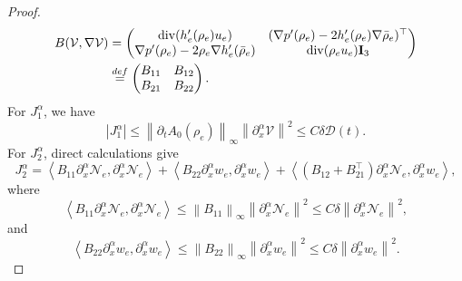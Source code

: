\documentclass[10pt,a4paper]{amsart}
\newcommand{\al}{\alpha}
\newcommand{\dive}{\mathrm{div}}
\newcommand{\pa}{\partial}
\newcommand{\pt}{\partial_t}
\begin{document}
\begin{proof}
\begin{equation*}
\begin{aligned}
    B(\mathcal{V},\nabla\mathcal{V})&=\begin{pmatrix}
    \dive(h'_e(\rho_e)u_e) & (\nabla p'(\rho_e)-2h'_e(\rho_e)\nabla\bar{\rho}_e)^\top\\
    \nabla p'(\rho_e)-2\rho_e \nabla h'_e(\bar{\rho}_e) & \dive(\rho_e u_e){\bf{I}}_3
    \end{pmatrix}\\
    &\overset{def}{=} \begin{pmatrix}
    B_{11} & B_{12} \\
    B_{21}& B_{22}
    \end{pmatrix}.
\end{aligned}
\end{equation*}
For $J_1^\alpha$, we have
\begin{equation}\label{19}
| J_1^\alpha| \leq \left\|\pt A_0(\rho_e) \right\|_\infty \left\|\pa_x^\al \mathcal{V} \right\|^2 \leq C\delta \mathcal{D}(t).
\end{equation}
For $J_2^\alpha$, direct calculations give
\begin{equation*}
    J_2^\alpha=\left< B_{11} \pa_x^\al\mathcal{N}_e ,\pa_x^\al \mathcal{N}_e \right>+\left< B_{22} \pa_x^\al w_e ,\pa_x^\al w_e \right>+\left< (B_{12}+B_{21}^\top) \pa_x^\al\mathcal{N}_e ,\pa_x^\al w_e \right>,
\end{equation*}
where
\begin{equation}\label{21}
    \left< B_{11} \pa_x^\al\mathcal{N}_e ,\pa_x^\al \mathcal{N}_e \right> \leq 
    \left\| B_{11} \right\|_\infty \left\| \pa_x^\al \mathcal{N}_e \right\|^2 \leq C\delta \left\| \pa_x^\al \mathcal{N}_e \right\|^2,
\end{equation}
and
\begin{equation}\label{22}
    \left< B_{22} \pa_x^\al w_e ,\pa_x^\al w_e \right> \leq 
    \left\| B_{22} \right\|_\infty \left\| \pa_x^\al w_e \right\|^2 \leq C\delta \left\| \pa_x^\al w_e \right\|^2.
\end{equation}


\end{proof}
\end{document}
